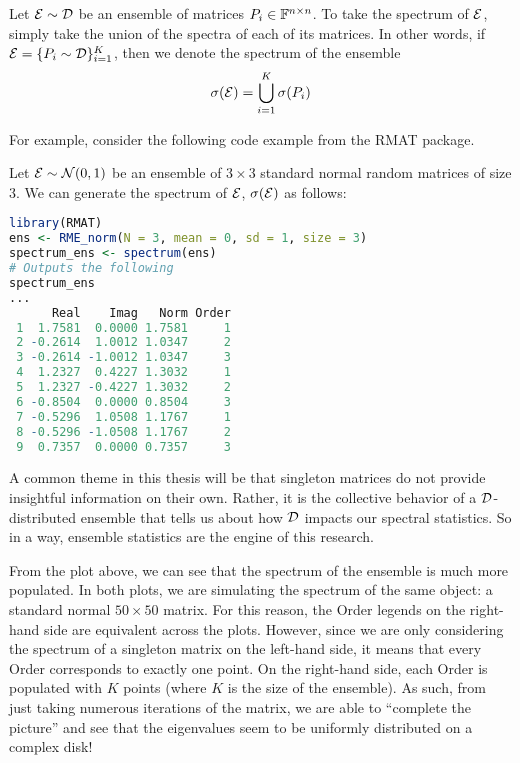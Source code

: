 \begin{definition}
Let $\mathcal{E} \sim \mathcal{D}$ be an ensemble of matrices $P_i \in \mathbb{F}^{n \times n}$. To take the spectrum of $\mathcal{E}$, simply take the union of the spectra of each of its matrices.
In other words, if $\mathcal{E} = \{P_i \sim \mathcal{D}\}_{i = 1}^K$, then we denote the spectrum of the ensemble
$$\sigma(\mathcal{E}) = \bigcup_{i=1}^K \sigma(P_i)$$
\end{definition}

\medskip
\noindent For example, consider the following code example from the RMAT package.
\begin{code}
Let $\mathcal{E} \sim \mathcal{N}(0,1)$ be an ensemble of $3 \times 3$ standard normal random matrices of size $3$. We can generate the spectrum of $\mathcal{E}$, $\sigma(\mathcal{E})$ as follows:
\end{code}

\begin{lstlisting}[language=R]
library(RMAT)
ens <- RME_norm(N = 3, mean = 0, sd = 1, size = 3)
spectrum_ens <- spectrum(ens)
# Outputs the following
spectrum_ens
...
      Real    Imag   Norm Order
 1  1.7581  0.0000 1.7581     1
 2 -0.2614  1.0012 1.0347     2
 3 -0.2614 -1.0012 1.0347     3
 4  1.2327  0.4227 1.3032     1
 5  1.2327 -0.4227 1.3032     2
 6 -0.8504  0.0000 0.8504     3
 7 -0.5296  1.0508 1.1767     1
 8 -0.5296 -1.0508 1.1767     2
 9  0.7357  0.0000 0.7357     3
\end{lstlisting}


A common theme in this thesis will be that singleton matrices do not provide insightful information on their own.
Rather, it is the collective behavior of a $\mathcal{D}$-distributed ensemble that tells us about how $\mathcal{D}$ impacts our spectral statistics.
So in a way, ensemble statistics are the engine of this research.


From the plot above, we can see that the spectrum of the ensemble is much more populated.
In both plots, we are simulating the spectrum of the same object: a standard normal $50 \times 50$ matrix.
For this reason, the Order legends on the right-hand side are equivalent across the plots.
However, since we are only considering the spectrum of a singleton matrix on the left-hand side, it means that every Order corresponds to exactly one point.
On the right-hand side, each Order is populated with $K$ points (where $K$ is the size of the ensemble).
As such, from just taking numerous iterations of the matrix, we are able to ``complete the picture'' and see that the eigenvalues seem to be uniformly distributed on a complex disk!

